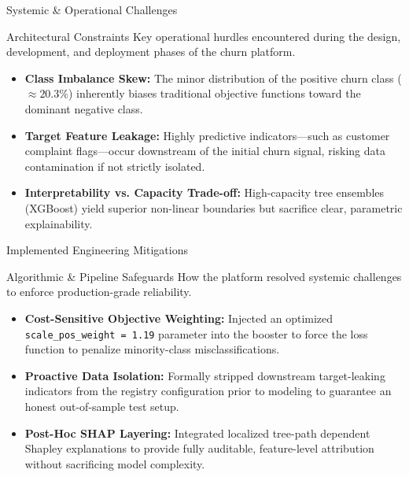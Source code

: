 
\begin{frame}{Systemic \& Operational Challenges}
    \begin{alertblock}{Architectural Constraints}
        Key operational hurdles encountered during the design, development, and deployment phases of the churn platform.
    \end{alertblock}
    \begin{itemize}
        \item \textbf{Class Imbalance Skew:} The minor distribution of the positive churn class ($\approx 20.3\%$) inherently biases traditional objective functions toward the dominant negative class.
        \item \textbf{Target Feature Leakage:} Highly predictive indicators—such as customer complaint flags—occur downstream of the initial churn signal, risking data contamination if not strictly isolated.
        \item \textbf{Interpretability vs. Capacity Trade-off:} High-capacity tree ensembles (XGBoost) yield superior non-linear boundaries but sacrifice clear, parametric explainability.
    \end{itemize}
\end{frame}

\begin{frame}{Implemented Engineering Mitigations}
    \begin{exampleblock}{Algorithmic \& Pipeline Safeguards}
        How the platform resolved systemic challenges to enforce production-grade reliability.
    \end{exampleblock}
    \begin{itemize}
        \item \textbf{Cost-Sensitive Objective Weighting:} Injected an optimized \texttt{scale\_pos\_weight = 1.19} parameter into the booster to force the loss function to penalize minority-class misclassifications.
        \item \textbf{Proactive Data Isolation:} Formally stripped downstream target-leaking indicators from the registry configuration prior to modeling to guarantee an honest out-of-sample test setup.
        \item \textbf{Post-Hoc SHAP Layering:} Integrated localized tree-path dependent Shapley explanations to provide fully auditable, feature-level attribution without sacrificing model complexity.
    \end{itemize}
\end{frame}

